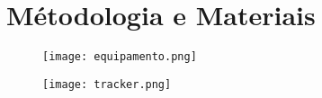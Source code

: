 \documentclass[a4papper, 10pt]{article}
\begin{document}
\section{Métodologia e Materiais}
\vspace{0.10 cm}
\begin{figure}[H]
    \centering
    \begin{minipage}[b]{0.5\textwidth}
        \centering
        \texttt{[image: equipamento.png]}
        \\
        \vspace{0.2cm}
        \label{fig:imagem1}
    \end{minipage}
    \hspace{0.02\textwidth}
    \begin{minipage}[b]{0.42\textwidth}
        \centering
        \texttt{[image: tracker.png]}
        \\
        \label{fig:imagem2}
    \end{minipage}  
\end{figure}
\end{document}
